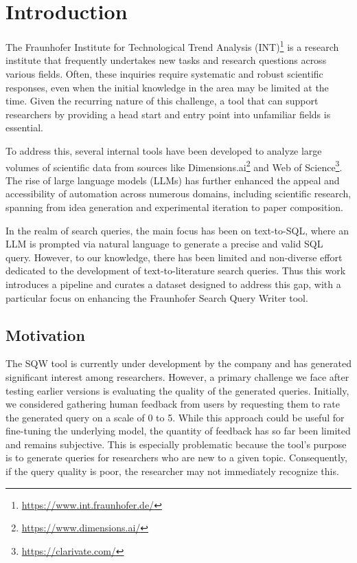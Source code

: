 \chapter{Introduction}\label{ch:intro}
The Fraunhofer Institute for Technological Trend Analysis (INT)\footnote{\url{https://www.int.fraunhofer.de/}} is a research institute that frequently undertakes new tasks and research questions across various fields. Often, these inquiries require systematic and robust scientific responses, even when the initial knowledge in the area may be limited at the time. Given the recurring nature of this challenge, a tool that can support researchers by providing a head start and entry point into unfamiliar fields is essential.

To address this, several internal tools have been developed to analyze large volumes of scientific data from sources like Dimensions.ai\footnote{\url{https://www.dimensions.ai/}} and Web of Science\footnote{\url{https://clarivate.com/}}. The rise of large language models (LLMs) has further enhanced the appeal and accessibility of automation across numerous domains, including scientific research, spanning from idea generation and experimental iteration to paper composition\cite{lu2024aiscientistfullyautomated}.

In the realm of search queries, the main focus has been on text-to-SQL\cite{dong2023c3}, where an LLM is prompted via natural language to generate a precise and valid SQL query. However, to our knowledge, there has been limited and non-diverse effort dedicated to the development of text-to-literature search queries. Thus this work introduces a pipeline and curates a dataset designed to address this gap, with a particular focus on enhancing the Fraunhofer Search Query Writer tool.

\section{Motivation}
The SQW tool is currently under development by the company and has generated significant interest among researchers. However, a primary challenge we face after testing earlier versions is evaluating the quality of the generated queries. Initially, we considered gathering human feedback from users by requesting them to rate the generated query on a scale of 0 to 5. While this approach could be useful for fine-tuning the underlying model, the quantity of feedback has so far been limited and remains subjective. This is especially problematic because the tool’s purpose is to generate queries for researchers who are new to a given topic. Consequently, if the query quality is poor, the researcher may not immediately recognize this.

